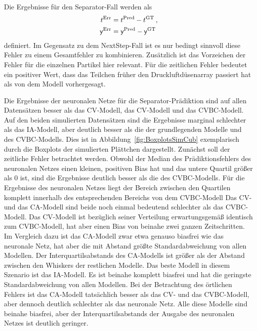 Die Ergebnisse für den Separator-Fall werden als
\begin{align*}
    t{^{\text{Err}}} &=  t{^{\text{Pred}}} -  t{^{\text{GT}}} \: ,\\
    \mathsf{y}{^{\text{Err}}} &=  \mathsf{y}{^{\text{Pred}}} -  \mathsf{y}{^{\text{GT}}}
\end{align*}
definiert.
Im Gegensatz zu dem NextStep-Fall ist es nur bedingt sinnvoll diese Fehler zu einem Gesamtfehler zu kombinieren.
Zusätzlich ist das Vorzeichen der Fehler für die einzelnen Partikel hier relevant.
Für die zeitlichen Fehler bedeutet ein positiver Wert, 
dass das Teilchen früher den Druckluftdüsenarray passiert hat als von dem Modell vorhergesagt. 


Die Ergebnisse der neuronalen Netze für die Separator-Prädiktion sind auf allen Datensätzen besser als das CV-Modell, das CV-Modell und das CVBC-Modell.
Auf den beiden simulierten Datensätzen sind die Ergebnisse marginal schlechter als das IA-Modell, 
aber deutlich besser als die der grundlegenden Modelle und des CVBC-Modells.
Dies ist in Abbildung~\ref{fig:BoxplotsSimCub} exemplarisch durch die Boxplots der simulierten Plättchen dargestellt.
Zunächst soll der zeitliche Fehler betrachtet werden.
Obwohl der Median des Prädiktionsfehlers des neuronalen Netzes einen kleinen, positiven Bias hat und das untere Quartil größer als 0 ist, sind die Ergebnisse deutlich besser als die des CVBC-Modells.
Für die Ergebnisse des neuronalen Netzes liegt der Bereich zwischen den Quartilen komplett innerhalb des entsprechenden Bereichs von dem CVBC-Modell
Das CV- und das CA-Modell sind beide noch einmal bedeutend schlechter als das CVBC-Modell.
Das CV-Modell ist bezüglich seiner Verteilung erwartungsgemäß identisch zum CVBC-Modell, hat aber einen Bias von beinahe zwei ganzen Zeitschritten.
Im Vergleich dazu ist das CA-Modell zwar etwa genauso biasfrei wie das neuronale Netz, hat aber die mit Abstand größte Standardabweichung von allen Modellen.
Der Interquartilsabstands des CA-Modells ist größer als der Abstand zwischen den Whiskers der restlichen Modelle.
Das beste Modell in diesem Szenario ist das IA-Modell.
Es ist beinahe komplett biasfrei und hat die geringste Standardabweichung von allen Modellen.
Bei der Betrachtung des örtlichen Fehlers ist das CA-Modell tatsächlich besser als das CV- und das CVBC-Modell, aber dennoch deutlich schlechter als das neuronale Netz.
Alle diese Modelle sind beinahe biasfrei, aber der Interquartilsabstands der Ausgabe des neuronalen Netzes ist deutlich geringer. 

